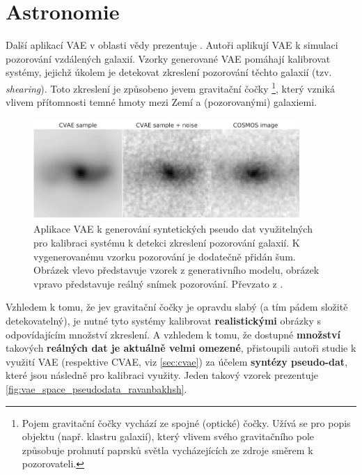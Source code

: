 \newpage
\section{Astronomie}
\label{sec:applications_astronomy_pseudo_data_synthesis}
Další aplikací VAE v oblasti vědy prezentuje \textcite{Ravanbakhsh2016}.
Autoři aplikují VAE k simulaci pozorování vzdálených galaxií.
Vzorky generované VAE pomáhají kalibrovat systémy, jejichž úkolem je detekovat zkreslení pozorování těchto galaxií (tzv. \emph{shearing}). Toto zkreslení je způsobeno jevem gravitační čočky
\footnote{Pojem gravitační čočky vychází ze spojné (optické) čočky. Užívá se pro popis objektu (např. klastru galaxií), který vlivem svého gravitačního pole způsobuje prohnutí paprsků světla vycházejících ze zdroje směrem k pozorovateli.},
který vzniká vlivem přítomnosti temné hmoty mezi Zemí a (pozorovanými) galaxiemi. \cite{Kingma2019}

\begin{figure}[H]
    \centering
    \includegraphics[width=0.9\textwidth]{figures/applications/vae_space_pseudodata_ravanbakhsh.png}
    \caption{Aplikace VAE k generování syntetických pseudo dat využitelných pro kalibraci systému k detekci zkreslení pozorování galaxií. K vygenerovanému vzorku pozorování je dodatečně přidán šum. Obrázek vlevo představuje vzorek z generativního modelu, obrázek vpravo představuje reálný snímek pozorování. Převzato z \textcite{Ravanbakhsh2016}.}
    \label{fig:vae_space_pseudodata_ravanbakhsh}
\end{figure}


Vzhledem k tomu, že jev gravitační čočky je opravdu slabý (a tím pádem složitě detekovatelný), je nutné tyto systémy kalibrovat \textbf{realistickými} obrázky s odpovídajícím množství zkreslení.
A vzhledem k tomu, že dostupné \textbf{množství} takových \textbf{reálných dat je aktuálně velmi omezené}, přistoupili autoři studie k využití VAE (respektive CVAE, viz \autoref{sec:cvae}) za účelem \textbf{syntézy pseudo-dat}, které jsou následně pro kalibraci využity. Jeden takový vzorek prezentuje \autoref{fig:vae_space_pseudodata_ravanbakhsh}. \cite{Ravanbakhsh2016}
